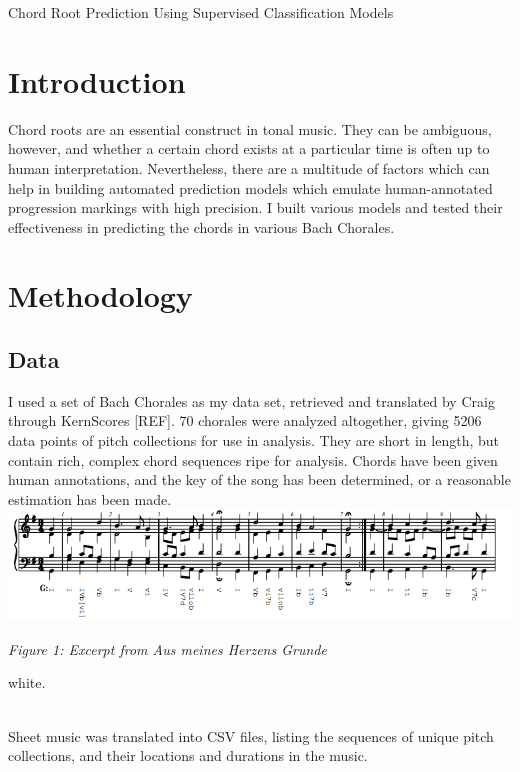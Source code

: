 \documentclass[12pt]{article}
\begin{document}
\begin{center}
\begin{Large} Chord Root Prediction Using Supervised Classification Models \end{Large}
\end{center}


\section{Introduction}
Chord roots are an essential construct in tonal music. They can be ambiguous, however, and whether a certain chord exists at a particular time is often up to human interpretation. Nevertheless, there are a multitude of factors which can help in building automated prediction models which emulate human-annotated progression markings with high precision. I built various models and tested their effectiveness in predicting the chords in various Bach Chorales.


\section{Methodology}
\subsection{Data}
I used a set of Bach Chorales as my data set, retrieved and translated by Craig through KernScores [REF]. 70 chorales were analyzed altogether, giving 5206 data points of pitch collections for use in analysis. They are short in length, but contain rich, complex chord sequences ripe for analysis. Chords have been given human annotations, and the key of the song has been determined, or a reasonable estimation has been made. \\

\includegraphics[trim = 0.5cm 0 0 0, scale=0.65]{staff.png}
\begin{center}\emph{Figure 1: Excerpt from Aus meines Herzens Grunde}\\ \end{center}

\begin{color}{white}.\end{color}\\Sheet music was translated into CSV files, listing the sequences of unique pitch collections, and their locations and durations in the music. \\
\end{document}
